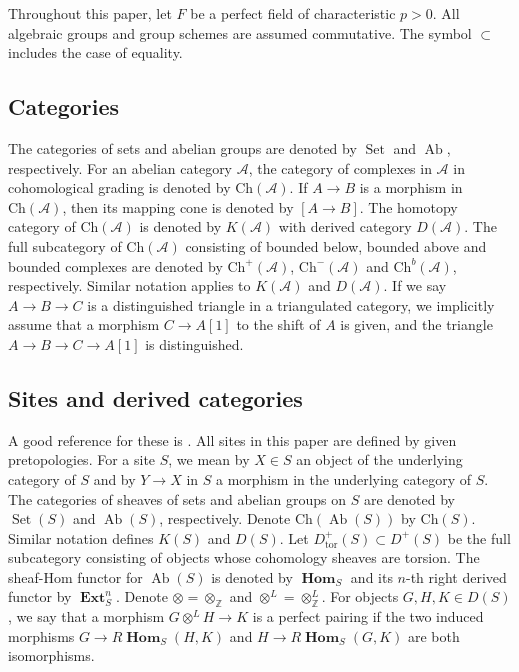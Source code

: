 \documentclass{amsart}
\theoremstyle{remark}
\numberwithin{equation}{subsection}
\newcommand{\tensor}{\mathbin{\otimes}}
\newcommand{\Z}{\mathbb{Z}}
\newcommand{\tor}{\mathrm{tor}}
\newcommand{\alg}[1]{\mathbf{#1}}
\newcommand{\Ch}{\mathrm{Ch}}
\DeclareMathOperator{\Ab}{Ab}
\DeclareMathOperator{\Set}{Set}
\DeclareMathOperator{\sheafhom}{\alg{Hom}}
\DeclareMathOperator{\sheafext}{\alg{Ext}}
\begin{document}
Throughout this paper, let $F$ be a perfect field of characteristic $p > 0$.
All algebraic groups and group schemes are assumed commutative.
The symbol $\subset$ includes the case of equality.


\subsection{Categories}

The categories of sets and abelian groups are denoted by $\Set$ and $\Ab$, respectively.
For an abelian category $\mathcal{A}$,
the category of complexes in $\mathcal{A}$ in cohomological grading is denoted by $\Ch(\mathcal{A})$.
If $A \to B$ is a morphism in $\Ch(\mathcal{A})$,
then its mapping cone is denoted by $[A \to B]$.
The homotopy category of $\Ch(\mathcal{A})$ is denoted by $K(\mathcal{A})$
with derived category $D(\mathcal{A})$.
The full subcategory of $\Ch(\mathcal{A})$ consisting of
bounded below, bounded above and bounded complexes are denoted by
$\Ch^{+}(\mathcal{A})$, $\Ch^{-}(\mathcal{A})$ and $\Ch^{b}(\mathcal{A})$, respectively.
Similar notation applies to $K(\mathcal{A})$ and $D(\mathcal{A})$.
If we say $A \to B \to C$ is a distinguished triangle in a triangulated category,
we implicitly assume that a morphism $C \to A[1]$ to the shift of $A$ is given,
and the triangle $A \to B \to C \to A[1]$ is distinguished.


\subsection{Sites and derived categories}

A good reference for these is \cite{KS06}.
All sites in this paper are defined by given pretopologies.
For a site $S$, we mean by $X \in S$ an object of the underlying category of $S$
and by $Y \to X$ in $S$ a morphism in the underlying category of $S$.
The categories of sheaves of sets and abelian groups on $S$ are denoted by
$\Set(S)$ and $\Ab(S)$, respectively.
Denote $\Ch(\Ab(S))$ by $\Ch(S)$.
Similar notation defines $K(S)$ and $D(S)$.
Let $D_{\tor}^{+}(S) \subset D^{+}(S)$ be the full subcategory
consisting of objects whose cohomology sheaves are torsion.
The sheaf-Hom functor for $\Ab(S)$ is denoted by $\sheafhom_{S}$
and its $n$-th right derived functor by $\sheafext_{S}^{n}$.
Denote $\tensor = \tensor_{\Z}$ and $\tensor^{L} = \tensor_{\Z}^{L}$.
For objects $G, H, K \in D(S)$,
we say that a morphism $G \tensor^{L} H \to K$ is a perfect pairing
if the two induced morphisms $G \to R \sheafhom_{S}(H, K)$ and
$H \to R \sheafhom_{S}(G, K)$ are both isomorphisms.
\end{document}
